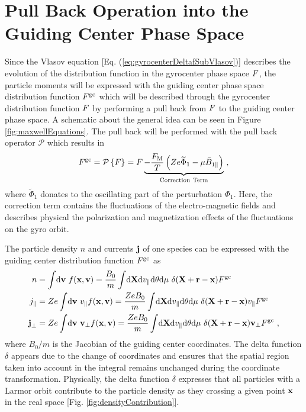 \section{Pull Back Operation into the Guiding Center Phase Space}
\label{sec:pullback}

Since the Vlasov equation [Eq. (\ref{eq:gyrocenterDeltafSubVlasov})] describes the evolution of the distribution function in the gyrocenter phase space $F$, the particle moments will be expressed with the guiding center phase space distribution function $F^\mathrm{gc}$ which will be described through the gyrocenter distribution function $F$ by performing a pull back from $F$ to the guiding center phase space. A schematic about the general idea can be seen in Figure \ref{fig:maxwellEquations}. The pull back will be performed with the pull back operator $\mathcal{P}$ which results in
\begin{gather}
	F^\mathrm{gc} = \mathcal{P} \left\{ F \right\} = F \underbrace{- \frac{F_\mathrm{M}}{T}\left(Ze \widetilde{\Phi}_1 - \mu \bar{B}_{1\parallel}\right)}_{\mathrm{Correction~Term}}~,
	\label{eq:pullback}
\end{gather}
where $\widetilde{\Phi}_1$ donates to the oscillating part of the perturbation $\Phi_1$. Here, the correction term contains the fluctuations of the electro-magnetic fields and describes physical the polarization and magnetization effects of the fluctuations on the gyro orbit. \cite{Brizard2007}
 

The particle density $n$ and currents $\boldsymbol{\mathbf{j}}$ of one species can be expressed with the guiding center distribution function $F^\mathrm{gc}$ as
\begin{gather}
	\begin{aligned}
		n &= \int \! \mathrm{d}\boldsymbol{\mathbf{v}} ~ f(\boldsymbol{\mathbf{x}}, \boldsymbol{\mathbf{v}}) = \frac{B_0}{m} \int \! \mathrm{d}\boldsymbol{\mathbf{X}}\mathrm{d}v_\parallel\mathrm{d}\theta\mathrm{d}\mu ~ \delta(\boldsymbol{\mathbf{X}} + \boldsymbol{\mathbf{r}} - \boldsymbol{\mathbf{x}}) F^\mathrm{gc} \\
		j_\parallel &= Ze \int \! \mathrm{d}\boldsymbol{\mathbf{v}} ~ v_\parallel f(\boldsymbol{\mathbf{x}}, \boldsymbol{\mathbf{v}})= \frac{Ze B_0}{m} \int \! \mathrm{d}\boldsymbol{\mathbf{X}}\mathrm{d}v_\parallel\mathrm{d}\theta\mathrm{d}\mu ~ \delta(\boldsymbol{\mathbf{X}} + \boldsymbol{\mathbf{r}} - \boldsymbol{\mathbf{x}}) v_\parallel F^\mathrm{gc} \\
		\boldsymbol{\mathbf{j}}_\perp &= Ze \int \! \mathrm{d}\boldsymbol{\mathbf{v}} ~ \boldsymbol{\mathbf{v}}_\perp f(\boldsymbol{\mathbf{x}}, \boldsymbol{\mathbf{v}}) = \frac{Ze B_0}{m} \int \! \mathrm{d}\boldsymbol{\mathbf{X}}\mathrm{d}v_\parallel\mathrm{d}\theta\mathrm{d}\mu ~ \delta(\boldsymbol{\mathbf{X}} + \boldsymbol{\mathbf{r}} - \boldsymbol{\mathbf{x}}) \boldsymbol{\mathbf{v}}_\perp F^\mathrm{gc} ~,
	\end{aligned}
	\label{eq:momentsGuidingCenter}
\end{gather}
where $B_0/m$ is the Jacobian of the guiding center coordinates. The delta function $\delta$ appears due to the change of coordinates and ensures that the spatial region taken into account in the integral remains unchanged during the coordinate transformation. Physically, the delta function $\delta$ expresses that all particles with a Larmor orbit contribute to the particle density as they crossing a given point $\boldsymbol{\mathbf{x}}$ in the real space [Fig. \ref{fig:densityContribution}]. 


